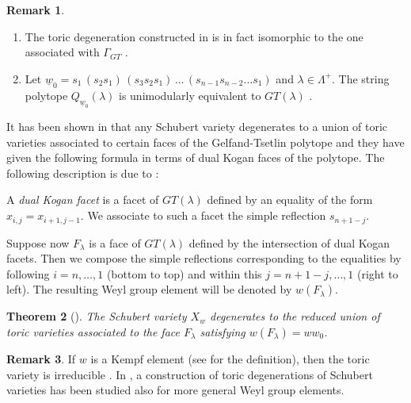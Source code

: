 \documentclass{emsprocart}
\newtheorem{theorem}{Theorem}[section]
\theoremstyle{definition}
\newtheorem{remark}[theorem]{Remark}
\begin{document}
\begin{remark}
\begin{enumerate}
\item The toric degeneration constructed in \cite{GL} is in fact isomorphic to the one associated with $\Gamma_{GT}$ \cite{KM}.
\item Let ${\underline{w}_0} = s_1\, (s_2s_1) \, (s_3s_2s_1) \, \ldots \, (s_{n-1}s_{n-2} \ldots s_1)$ and $\lambda \in \Lambda^+$. The string polytope $Q_{{\underline{w}_0}}(\lambda)$ is unimodularly equivalent to $GT(\lambda)$ \cite{L3}.
\end{enumerate}
\end{remark}

It has been shown in \cite{KM} that any Schubert variety degenerates to a union of toric varieties associated to certain faces of the Gelfand-Tsetlin polytope and they have given the following formula in terms of dual Kogan faces of the polytope. The following description is due to \cite{KST}:
\par
A \textit{dual Kogan facet} is a facet  of $GT(\lambda)$
 defined by an equality of the form $x_{i,j} = x_{i+1, j-1}$. We associate to such a facet the simple reflection $s_{n+1 - j}$.
\par
Suppose now $F_\lambda$ is a face of $GT(\lambda)$ defined by the intersection of dual Kogan facets. Then we compose the simple reflections corresponding to the equalities by following $i =n, \ldots, 1$ (bottom to top) and within this $j = n+1 - j , \ldots , 1$ (right to left). The resulting Weyl group element will be denoted by $w(F_\lambda)$.
\begin{theorem}[\cite{KM}]
The Schubert variety $X_w$ degenerates to the reduced union of toric varieties associated to the face $F_\lambda$ satisfying $w(F_\lambda) = ww_0$.
\end{theorem}
\begin{remark}\label{rem-kempf}
If $w$ is a Kempf element (see \cite{La} for the definition), then the toric variety is irreducible \cite{KST}. In \cite{DY2}, a 
construction of toric degenerations of Schubert varieties has been studied also for more general Weyl group elements.
\end{remark}
\end{document}
